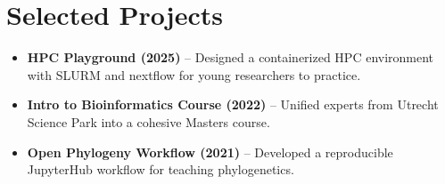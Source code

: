 \documentclass[a4paper,10pt]{article}
\begin{document}
\section*{Selected Projects}
\begin{itemize}
  \item \textbf{HPC Playground (2025)} – Designed a containerized HPC environment with SLURM and nextflow for young researchers to practice.
  \item \textbf{Intro to Bioinformatics Course (2022)} – Unified experts from Utrecht Science Park into a cohesive Masters course.
  \item \textbf{Open Phylogeny Workflow (2021)} – Developed a reproducible JupyterHub workflow for teaching phylogenetics. 
\end{itemize}



\MySkip
\end{document}
